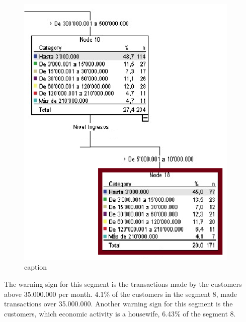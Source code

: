 \begin{itemize}
\begin{figure}[htbp]
  \centering
  \includegraphics[width=0.95\textwidth]{Segmento8}
  \caption{caption}
  \label{fig:label}
\end{figure}
The warning sign for this segment is the transactions made by the customers above 35.000.000 per month.  4.1\% of the	 customers in the segment 8, made transactions over 35.000.000.
Another warning sign for this segment is the customers, which economic activity is a housewife, 6.43\% of the segment 8.
\end{itemize}
